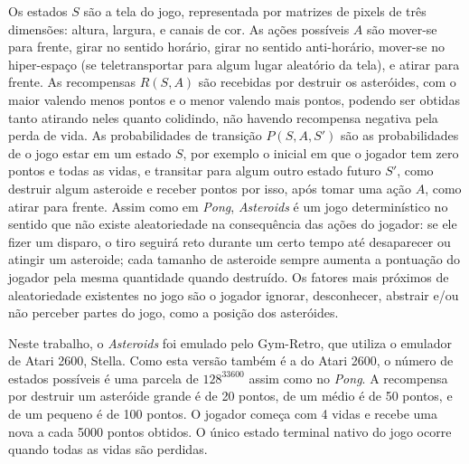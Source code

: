 Os estados $S$ são a tela do jogo, representada por matrizes de pixels de três dimensões: altura, largura, e canais de cor.
As ações possíveis $A$ são mover-se para frente, girar no sentido horário, girar no sentido anti-horário, mover-se no hiper-espaço (se teletransportar para algum lugar aleatório da tela), e atirar para frente.
As recompensas $R(S,A)$ são recebidas por destruir os asteróides, com o maior valendo menos pontos e o menor valendo mais pontos, podendo ser obtidas tanto atirando neles quanto colidindo, não havendo recompensa negativa pela perda de vida.
As probabilidades de transição $P(S,A,S')$ são as probabilidades de o jogo estar em um estado $S$, por exemplo o inicial em que o jogador tem zero pontos e todas as vidas, e transitar para algum outro estado futuro $S'$, como destruir algum asteroide e receber pontos por isso, após tomar uma ação $A$, como atirar para frente.
Assim como em \textit{Pong}, \textit{Asteroids} é um jogo determinístico no sentido que não existe aleatoriedade na consequência das ações do jogador: se ele fizer um disparo, o tiro seguirá reto durante um certo tempo até desaparecer ou atingir um asteroide; cada tamanho de asteroide sempre aumenta a pontuação do jogador pela mesma quantidade quando destruído.
Os fatores mais próximos de aleatoriedade existentes no jogo são o jogador ignorar, desconhecer, abstrair e/ou não perceber partes do jogo, como a posição dos asteróides.

Neste trabalho, o \textit{Asteroids} foi emulado pelo Gym-Retro, que utiliza o emulador de Atari 2600, Stella.
Como esta versão também é a do Atari 2600, o número de estados possíveis é uma parcela de $128^{33600}$ assim como no \textit{Pong}.
A recompensa por destruir um asteróide grande é de 20 pontos, de um médio é de 50 pontos, e de um pequeno é de 100 pontos.
O jogador começa com 4 vidas e recebe uma nova a cada 5000 pontos obtidos.
O único estado terminal nativo do jogo ocorre quando todas as vidas são perdidas.

